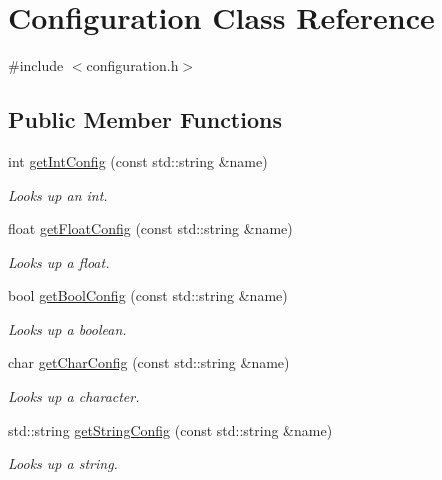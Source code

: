 \hypertarget{classConfiguration}{\section{Configuration Class Reference}
\label{classConfiguration}
}


{\ttfamily \#include $<$configuration.\-h$>$}

\subsection*{Public Member Functions}
\begin{DoxyCompactItemize}
\item 
int \hyperlink{classConfiguration_a0048183bbfe8d868d863fcf64ba1a24c}{get\-Int\-Config} (const std\-::string \&name)
\begin{DoxyCompactList}\small\item\em Looks up an int. \end{DoxyCompactList}\item 
float \hyperlink{classConfiguration_ac172e8aae1d31223d9b871c16c7dc1fd}{get\-Float\-Config} (const std\-::string \&name)
\begin{DoxyCompactList}\small\item\em Looks up a float. \end{DoxyCompactList}\item 
bool \hyperlink{classConfiguration_aec58e1307d229f54acb148413b06f7d5}{get\-Bool\-Config} (const std\-::string \&name)
\begin{DoxyCompactList}\small\item\em Looks up a boolean. \end{DoxyCompactList}\item 
char \hyperlink{classConfiguration_a39ea5aba3f0eedde84e761035740ff82}{get\-Char\-Config} (const std\-::string \&name)
\begin{DoxyCompactList}\small\item\em Looks up a character. \end{DoxyCompactList}\item 
std\-::string \hyperlink{classConfiguration_a1329530937755303fe747c370627a60b}{get\-String\-Config} (const std\-::string \&name)
\begin{DoxyCompactList}\small\item\em Looks up a string. \end{DoxyCompactList}\end{DoxyCompactItemize}
